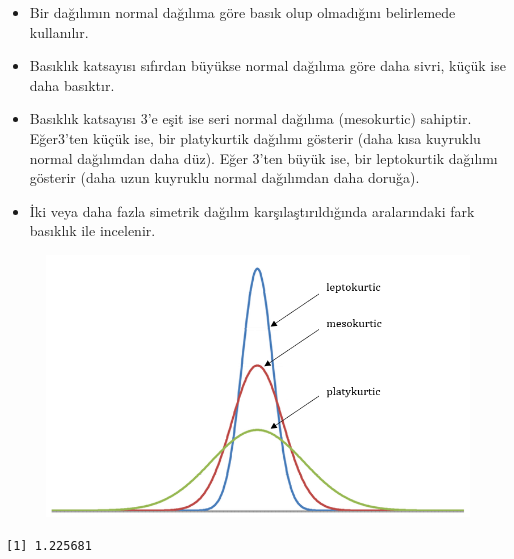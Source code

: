 \documentclass[
  letterpaper,
  DIV=11,
  numbers=noendperiod]{scrreprt}
\newenvironment{Shaded}{\begin{snugshade}}{\end{snugshade}}
\newcommand{\AttributeTok}[1]{\textcolor[rgb]{0.40,0.45,0.13}{#1}}
\newcommand{\CommentTok}[1]{\textcolor[rgb]{0.37,0.37,0.37}{#1}}
\newcommand{\ConstantTok}[1]{\textcolor[rgb]{0.56,0.35,0.01}{#1}}
\newcommand{\FunctionTok}[1]{\textcolor[rgb]{0.28,0.35,0.67}{#1}}
\newcommand{\NormalTok}[1]{\textcolor[rgb]{0.00,0.23,0.31}{#1}}
\newcommand{\SpecialCharTok}[1]{\textcolor[rgb]{0.37,0.37,0.37}{#1}}
\begin{document}
\begin{itemize}
\item
  Bir dağılımın normal dağılıma göre basık olup olmadığını belirlemede
  kullanılır.
\item
  Basıklık katsayısı sıfırdan büyükse normal dağılıma göre daha sivri,
  küçük ise daha basıktır.
\item
  Basıklık katsayısı 3'e eşit ise seri normal dağılıma (mesokurtic)
  sahiptir. Eğer3'ten küçük ise, bir platykurtik dağılımı gösterir (daha
  kısa kuyruklu normal dağılımdan daha düz). Eğer 3'ten büyük ise, bir
  leptokurtik dağılımı gösterir (daha uzun kuyruklu normal dağılımdan
  daha doruğa).
\item
  İki veya daha fazla simetrik dağılım karşılaştırıldığında aralarındaki
  fark basıklık ile incelenir.
\end{itemize}

\begin{figure}

{\centering \includegraphics{images/kurtosis.png}

}

\end{figure}

\begin{Shaded}
\end{Shaded}

\begin{verbatim}
[1] 1.225681
\end{verbatim}
\end{document}
